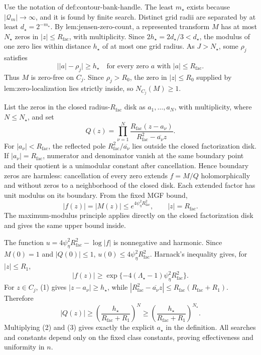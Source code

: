 Use the notation of \(\text{def:contour-bank-handle}\).  The least \(m_{\star}\) exists because \(|\mathcal Q_m|\to\infty\), and it is found by finite search.  Distinct grid radii are separated by at least \(d_{\star}=2^{-m_{\star}}\).  By \(\text{lem:jensen-zero-count}\), a represented transform \(M\) has at most \(N_{\star}\) zeros in \(|z|\le R_{\mathrm{fac}}\), with multiplicity.  Since \(2h_{\star}=2d_{\star}/3<d_{\star}\), the modulus of one zero lies within distance \(h_{\star}\) of at most one grid radius.  As \(J>N_{\star}\), some \(\rho_j\) satisfies
\[
 \bigl||a|-\rho_j\bigr|\ge h_{\star}
 \quad\text{for every zero }a\text{ with }|a|\le R_{\mathrm{fac}}. \tag{1}
\]
Thus \(M\) is zero-free on \(C_j\).  Since \(\rho_j>R_0\), the zero in \(|z|\le R_0\) supplied by \(\text{lem:zero-localization}\) lies strictly inside, so \(N_{C_j}(M)\ge1\).

List the zeros in the closed radius-\(R_{\mathrm{fac}}\) disk as \(a_1,\ldots,a_N\), with multiplicity, where \(N\le N_{\star}\), and set
\[
 Q(z)=\prod_{\nu=1}^{N}
 \frac{R_{\mathrm{fac}}(z-a_\nu)}{R_{\mathrm{fac}}^2-\overline{a_\nu}z}.
\]
For \(|a_\nu|<R_{\mathrm{fac}}\), the reflected pole \(R_{\mathrm{fac}}^2/\overline{a_\nu}\) lies outside the closed factorization disk.  If \(|a_\nu|=R_{\mathrm{fac}}\), numerator and denominator vanish at the same boundary point and their quotient is a unimodular constant after cancellation.  Hence boundary zeros are harmless: cancellation of every zero extends \(f=M/Q\) holomorphically and without zeros to a neighborhood of the closed disk.  Each extended factor has unit modulus on its boundary.  From the fixed MGF bound,
\[
 |f(z)|=|M(z)|\le e^{4\psi_{\eta}^2R_{\mathrm{fac}}^2},
 \qquad |z|=R_{\mathrm{fac}}.
\]
The maximum-modulus principle applies directly on the closed factorization disk and gives the same upper bound inside.

The function \(u=4\psi_{\eta}^2R_{\mathrm{fac}}^2-\log|f|\) is nonnegative and harmonic.  Since \(M(0)=1\) and \(|Q(0)|\le1\), \(u(0)\le4\psi_{\eta}^2R_{\mathrm{fac}}^2\).  Harnack's inequality gives, for \(|z|\le R_1\),
\[
 |f(z)|\ge
 \exp\{-4(\Lambda_{\star}-1)\psi_{\eta}^2R_{\mathrm{fac}}^2\}. \tag{2}
\]
For \(z\in C_j\), (1) gives \(|z-a_\nu|\ge h_{\star}\), while
\(|R_{\mathrm{fac}}^2-\overline{a_\nu}z|\le R_{\mathrm{fac}}(R_{\mathrm{fac}}+R_1)\).  Therefore
\[
 |Q(z)|\ge
 \left(\frac{h_{\star}}{R_{\mathrm{fac}}+R_1}\right)^N
 \ge
 \left(\frac{h_{\star}}{R_{\mathrm{fac}}+R_1}\right)^{N_{\star}}. \tag{3}
\]
Multiplying (2) and (3) gives exactly the explicit \(a_{\star}\) in the definition.  All searches and constants depend only on the fixed class constants, proving effectiveness and uniformity in \(n\).